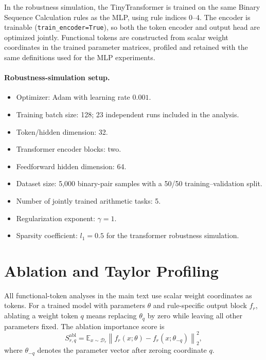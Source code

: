 \documentclass{article}
\begin{document}
In the robustness simulation, the TinyTransformer is trained on the same Binary Sequence Calculation rules as the MLP, using rule indices 0--4. The encoder is trainable (\texttt{train\_encoder=True}), so both the token encoder and output head are optimized jointly. Functional tokens are constructed from scalar weight coordinates in the trained parameter matrices, profiled and retained with the same definitions used for the MLP experiments.

\paragraph{Robustness-simulation setup.}
\begin{itemize}
    \item Optimizer: Adam with learning rate $0.001$.
    \item Training batch size: 128; 23 independent runs included in the analysis.
    \item Token/hidden dimension: 32.
    \item Transformer encoder blocks: two.
    \item Feedforward hidden dimension: 64.
    \item Dataset size: 5{,}000 binary-pair samples with a 50/50 training--validation split.
    \item Number of jointly trained arithmetic tasks: 5.
    \item Regularization exponent: $\gamma=1$.
    \item Sparsity coefficient: $l_1=0.5$ for the transformer robustness simulation.
\end{itemize}

\section{Ablation and Taylor Profiling}
\label{appendix:Taylor}

All functional-token analyses in the main text use scalar weight coordinates as tokens. For a trained model with parameters $\theta$ and rule-specific output block $f_r$, ablating a weight token $q$ means replacing $\theta_q$ by zero while leaving all other parameters fixed. The ablation importance score is
\begin{equation}
S^{\mathrm{abl}}_{r,q}=\mathbb{E}_{x\sim\mathcal{D}_r}\left\|f_r(x;\theta)-f_r(x;\theta_{-q})\right\|_2^2,
\end{equation}
where $\theta_{-q}$ denotes the parameter vector after zeroing coordinate $q$.
\end{document}
